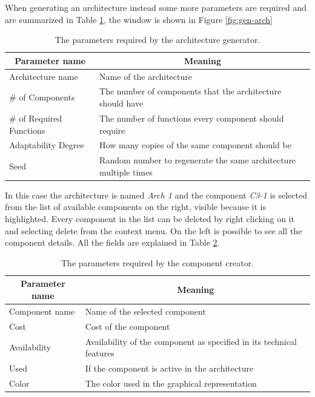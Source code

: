 When generating an architecture instead some more parameters are required and are summarized in Table \ref{tab:gen-parameters}, the window is shown in Figure \ref{fig:gen-arch}

\begin{table}[ht!b]
	\centering
	\begin{tabular}{|l|l|}
		\hline
		\multicolumn{1}{|c|}{Parameter name} & \multicolumn{1}{c|}{Meaning} \\
		\hline 
		Architecture name & Name of the architecture \\
		\hline
		\# of Components & The number of components that the architecture should have \\
		\hline
		\# of Required Functions & The number of functions every component should require \\
		\hline
		Adaptability Degree & How many copies of the same component should be \\
		\hline
		Seed & Random number to regenerate the same architecture multiple times \\
		\hline
		
	\end{tabular} 
	\caption[Generator parameters]{The parameters required by the architecture generator.}
	\label{tab:gen-parameters}
\end{table}

In this case the architecture is named \emph{Arch 1} and the component \emph{C3-1} is selected from the list of available components on the right, visible because it is highlighted. Every component in the list can be deleted by right clicking on it and selecting delete from the context menu. On the left is possible to see all the component details. All the fields are explained in Table \ref{tab:comp-details}.

\begin{table}[ht!b]
	\centering
	\begin{tabular}{|l|l|}
		\hline
		\multicolumn{1}{|c|}{Parameter name} & \multicolumn{1}{c|}{Meaning} \\
		\hline 
		Component name & Name of the selected component \\
		\hline
		Cost & Cost of the component \\
		\hline
		Availability & Availability of the component as specified in its technical features\\
		\hline
		Used & If the component is active in the architecture \\
		\hline
		Color & The color used in the graphical representation \\
		\hline
		
	\end{tabular} 
	\caption[Component parameters]{The parameters required by the component creator.}
	\label{tab:comp-details}
\end{table}

